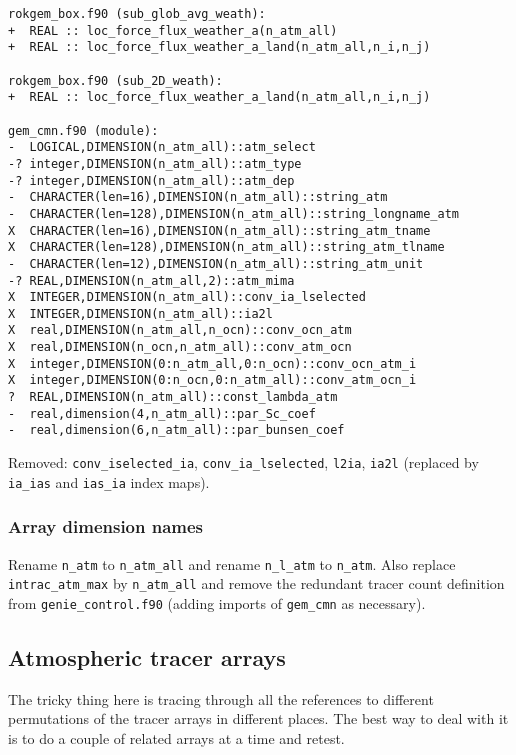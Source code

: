 \documentclass[a4paper,10pt,article]{memoir}
\begin{document}
\begin{verbatim}
rokgem_box.f90 (sub_glob_avg_weath):
+  REAL :: loc_force_flux_weather_a(n_atm_all)
+  REAL :: loc_force_flux_weather_a_land(n_atm_all,n_i,n_j)

rokgem_box.f90 (sub_2D_weath):
+  REAL :: loc_force_flux_weather_a_land(n_atm_all,n_i,n_j)

gem_cmn.f90 (module):
-  LOGICAL,DIMENSION(n_atm_all)::atm_select
-? integer,DIMENSION(n_atm_all)::atm_type
-? integer,DIMENSION(n_atm_all)::atm_dep
-  CHARACTER(len=16),DIMENSION(n_atm_all)::string_atm
-  CHARACTER(len=128),DIMENSION(n_atm_all)::string_longname_atm
X  CHARACTER(len=16),DIMENSION(n_atm_all)::string_atm_tname
X  CHARACTER(len=128),DIMENSION(n_atm_all)::string_atm_tlname
-  CHARACTER(len=12),DIMENSION(n_atm_all)::string_atm_unit
-? REAL,DIMENSION(n_atm_all,2)::atm_mima
X  INTEGER,DIMENSION(n_atm_all)::conv_ia_lselected
X  INTEGER,DIMENSION(n_atm_all)::ia2l
X  real,DIMENSION(n_atm_all,n_ocn)::conv_ocn_atm
X  real,DIMENSION(n_ocn,n_atm_all)::conv_atm_ocn
X  integer,DIMENSION(0:n_atm_all,0:n_ocn)::conv_ocn_atm_i
X  integer,DIMENSION(0:n_ocn,0:n_atm_all)::conv_atm_ocn_i
?  REAL,DIMENSION(n_atm_all)::const_lambda_atm
-  real,dimension(4,n_atm_all)::par_Sc_coef
-  real,dimension(6,n_atm_all)::par_bunsen_coef
\end{verbatim}

Removed: \texttt{conv\_iselected\_ia}, \texttt{conv\_ia\_lselected},
\texttt{l2ia}, \texttt{ia2l} (replaced by \texttt{ia\_ias} and
\texttt{ias\_ia} index maps).


\subsubsection{Array dimension names}

Rename \texttt{n\_atm} to \texttt{n\_atm\_all} and rename
\texttt{n\_l\_atm} to \texttt{n\_atm}.  Also replace
\texttt{intrac\_atm\_max} by \texttt{n\_atm\_all} and remove the
redundant tracer count definition from \texttt{genie\_control.f90}
(adding imports of \texttt{gem\_cmn} as necessary).

\subsection{Atmospheric tracer arrays}

The tricky thing here is tracing through all the references to
different permutations of the tracer arrays in different places.  The
best way to deal with it is to do a couple of related arrays at a time
and retest.
\end{document}

